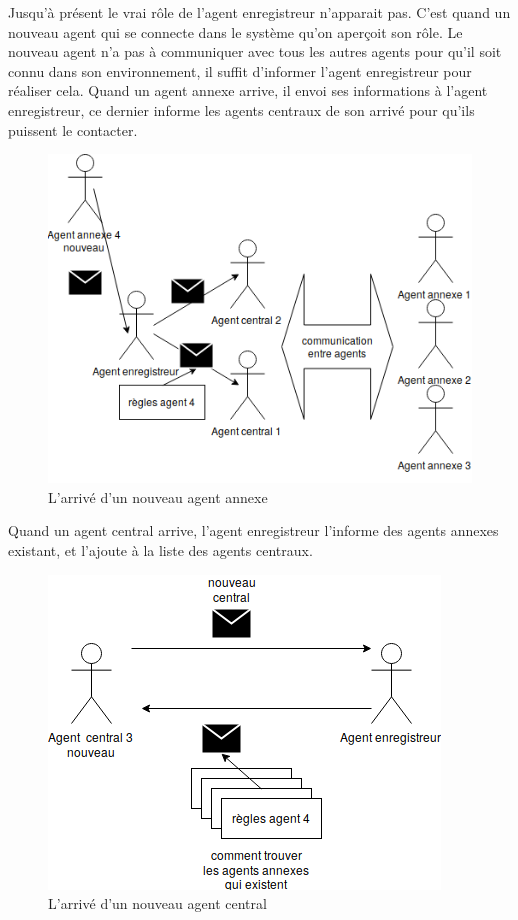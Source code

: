 \newpage
Jusqu’à présent le vrai rôle de l’agent enregistreur n’apparait pas. C’est quand un nouveau agent qui se connecte dans le système qu’on aperçoit son rôle. Le nouveau agent n’a pas à communiquer avec tous les autres agents pour qu’il soit connu dans son environnement, il suffit d’informer l’agent enregistreur pour réaliser cela. Quand un agent annexe arrive, il envoi ses informations à l’agent enregistreur, ce dernier informe les agents centraux de son arrivé pour qu’ils puissent le contacter.
\begin{figure}[H]
	\centering
	\includegraphics[scale=0.6]{imgs/newAnnexe.png}
	\caption{L'arrivé d'un nouveau agent annexe}
	\label{fig:newAnnexe}
\end{figure}
Quand un agent central arrive, l’agent enregistreur l’informe des agents annexes existant, et l’ajoute à la liste des agents centraux.
\begin{figure}[H]
	\centering
	\includegraphics[scale=0.6]{imgs/newCentral.png}
	\caption{L'arrivé d'un nouveau agent central}
	\label{fig:newCentral}
\end{figure}
\newpage

